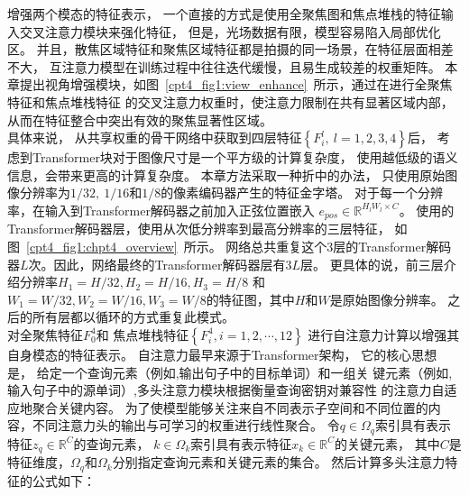 增强两个模态的特征表示，
一个直接的方式是使用全聚焦图和焦点堆栈的特征输入交叉注意力模块来强化特征，
但是，光场数据有限，模型容易陷入局部优化区。
并且，散焦区域特征和聚焦区域特征都是拍摄的同一场景，在特征层面相差不大，
互注意力模型在训练过程中往往迭代缓慢，且易生成较差的权重矩阵。
本章提出视角增强模块，如图~\ref{cpt4_fig1:view_enhance}~所示，通过在进行全聚焦特征和焦点堆栈特征
的交叉注意力权重时，使注意力限制在共有显著区域内部，
从而在特征整合中突出有效的聚焦显著性区域。\\
%
%
%
%
\indent
具体来说，
从共享权重的骨干网络中获取到四层特征$\left \{ F_{i}^{l},~l=1,2,3,4 \right \}$后，
考虑到Transformer块对于图像尺寸是一个平方级的计算复杂度，
使用越低级的语义信息，会带来更高的计算复杂度。
本章方法采取一种折中的办法，
只使用原始图像分辨率为$1/32,~1/16$和$1/8$的像素编码器产生的特征金字塔。
对于每一个分辨率，在输入到Transformer解码器之前加入正弦位置嵌入
$ e_{pos}\in \mathbb{R}^{H_{l}W_{l}\times C} $。
使用的Transformer解码器层，使用从次低分辨率到最高分辨率的三层特征，
如图~\ref{cpt4_fig1:chpt4_overview}~所示。
网络总共重复这个3层的Transformer解码器$L$次。因此，网络最终的Transformer解码器层有$3L$层。
更具体的说，前三层介绍分辨率$H_{1}=H/32,H_{2}=H/16,H_{3}=H/8$
和$W_{1}=W/32,W_{2}=W/16,W_{3}=W/8$的特征图，其中$H$和$W$是原始图像分辨率。
之后的所有层都以循环的方式重复此模式。\\
%
%
%
%
\indent
对全聚焦特征$ F_{0}^{4} $和
焦点堆栈特征$ \left \{ F_{i}^{4}, i=1,2, \cdots, 12 \right \}$
进行自注意力计算以增强其自身模态的特征表示。
自注意力最早来源于Transformer架构，
它的核心思想是，
给定一个查询元素（例如,输出句子中的目标单词）和一组关
键元素（例如,输入句子中的源单词）,多头注意力模块根据衡量查询密钥对兼容性
的注意力自适应地聚合关键内容。
为了使模型能够关注来自不同表示子空间和不同位置的内容，不同注意力头的输出与可学习的权重进行线性聚合。
%
%
%
%
%
%
%
%
%
令$q\in \Omega_{q}$索引具有表示特征$z_{q} \in \mathbb{R}^{C}$的查询元素，
$k\in \Omega_{k}$索引具有表示特征$x_{k} \in \mathbb{R}^{C}$的关键元素，
其中$C$是特征维度，$\Omega_{q}$和$\Omega_{k}$分别指定查询元素和关键元素的集合。
然后计算多头注意力特征的公式如下：
